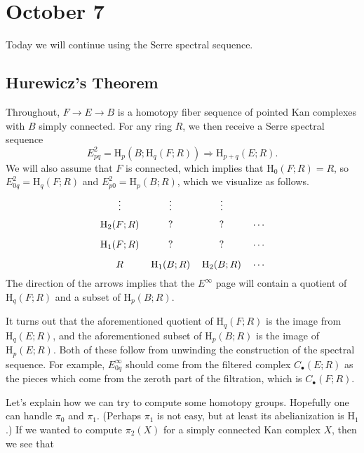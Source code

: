 \documentclass[../notes.tex]{subfiles}
\begin{document}
\section{October 7}
Today we will continue using the Serre spectral sequence.

\subsection{Hurewicz's Theorem}
Throughout, $F\to E\to B$ is a homotopy fiber sequence of pointed Kan complexes with $B$ simply connected. For any ring $R$, we then receive a Serre spectral sequence
\[E^2_{pq}=\mathrm H_p(B;\mathrm H_q(F;R))\Rightarrow\mathrm H_{p+q}(E;R).\]
We will also assume that $F$ is connected, which implies that $\mathrm H_0(F;R)=R$, so $E^2_{0q}=\mathrm H_q(F;R)$ and $E^2_{p0}=\mathrm H_p(B;R)$, which we visualize as follows.
\[\begin{tikzcd}[cramped,sep=tiny]
	\vdots & \vdots & \vdots \\
	{\mathrm H_2(F;R)} & {?} & {?} & \cdots \\
	{\mathrm H_1(F;R)} & {?} & {?} & \cdots \\
	R & {\mathrm H_1(B;R)} & {\mathrm H_2(B;R)} & \cdots
\end{tikzcd}\]
The direction of the arrows implies that the $E^\infty$ page will contain a quotient of $\mathrm H_q(F;R)$ and a subset of $\mathrm H_p(B;R)$.
\begin{remark} \label{rem:filtration-pieces-serre-spectral}
	It turns out that the aforementioned quotient of $\mathrm H_q(F;R)$ is the image from $\mathrm H_q(E;R)$, and the aforementioned subset of $\mathrm H_p(B;R)$ is the image of $\mathrm H_p(E;R)$. Both of these follow from unwinding the construction of the spectral sequence. For example, $E^\infty_{0q}$ should come from the filtered complex $C_\bullet(E;R)$ as the pieces which come from the zeroth part of the filtration, which is $C_\bullet(F;R)$.
\end{remark}
Let's explain how we can try to compute some homotopy groups. Hopefully one can handle $\pi_0$ and $\pi_1$. (Perhaps $\pi_1$ is not easy, but at least its abelianization is $\mathrm H_1$.) If we wanted to compute $\pi_2(X)$ for a simply connected Kan complex $X$, then we see that
\end{document}
